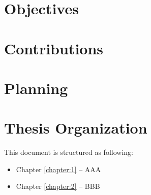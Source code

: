 \section{Objectives}


\section{Contributions}
\section{Planning}
\section{Thesis Organization}


This document is structured as following: 
\begin{itemize}
\item Chapter \ref{chapter:1} – AAA 
\item Chapter \ref{chapter:2} – BBB 
\end{itemize}
